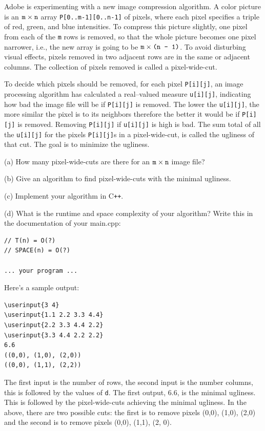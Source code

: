 Adobe is experimenting with a new image compression
algorithm.
A color picture is an
$\verb!m! \times \verb!n!$
array \verb!P[0..m-1][0..n-1]! of pixels,
where each pixel specifies a triple of
red, green, and blue intensities.
To compress this picture slightly,
one pixel from each of the \verb!m! rows is removed,
so that the whole picture becomes one pixel
narrower, i.e., the new array is going to be
$\verb!m! \times \verb!(n - 1)!$.
To avoid disturbing visual effects, pixels
removed in two adjacent rows are in the same
or adjacent columns.
The collection of pixels removed is called a pixel-wide-cut.

To decide which pixels should be removed,
for each pixel
\verb!P[i][j]!,
an image processing algorithm
has calculated a real--valued
measure \verb!u[i][j]!,
indicating how bad the image file will be
if \verb!P[i][j]! is removed.
The lower the \verb!u[i][j]!, the
more similar the pixel is to its neighbors
therefore the better it would be if \verb!P[i][j]! is removed.
Removing \verb!P[i][j]! if \verb!u[i][j]! is high is bad.
The sum total of all the \verb!u[i][j]! for the pixels
\verb!P[i][j]!s in a pixel-wide-cut, is called the ugliness of that cut.
The goal is to minimize the ugliness.

(a)
How many pixel-wide-cuts are there for an
$\verb!m! \times \verb!n!$ image file?

(b)
Give an algorithm to find pixel-wide-cuts with the
minimal ugliness.

(c)
Implement your algorithm in C\texttt{++}.

(d)
What is the runtime and space complexity
of your algorithm? 
Write this in the documentation of your main.cpp:
\begin{Verbatim}[frame=single,fontsize=\small]
// T(n) = O(?)
// SPACE(n) = O(?)

... your program ...
\end{Verbatim}

Here's a sample output:
\begin{Verbatim}[frame=single,commandchars=\\\{\}]
\userinput{3 4}
\userinput{1.1 2.2 3.3 4.4}
\userinput{2.2 3.3 4.4 2.2}
\userinput{3.3 4.4 2.2 2.2}
6.6
((0,0), (1,0), (2,0))
((0,0), (1,1), (2,2))
\end{Verbatim}
The first input is the number of rows,
the second input is the number columns,
this is followed by the values of \verb!d!.
The first output, 6.6, is the minimal ugliness.
This is followed by the pixel-wide-cuts achieving the minimal ugliness.
In the above, there are two possible cuts:
the first is to remove pixels (0,0), (1,0), (2,0)
and the second is to remove pixels (0,0), (1,1), (2, 0).


